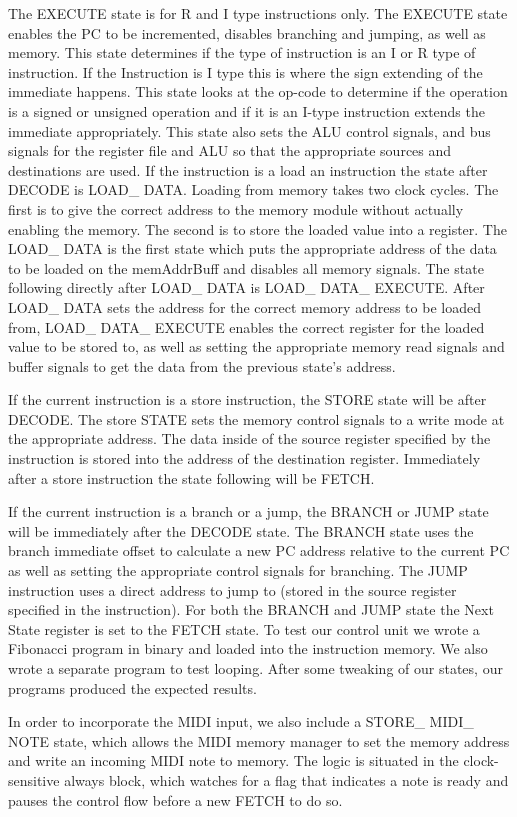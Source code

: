 \documentclass[onecolumn, 12pt]{IEEEtran}
\begin{document}
The EXECUTE state is for R and I type instructions only. The EXECUTE state enables the PC to be incremented, disables branching and jumping, as well as memory. This state determines if the type of instruction is an I or R type of instruction. If the Instruction is I type this is where the sign extending of the immediate happens. This state looks at the op-code to determine if the operation is a signed or unsigned operation and if it is an I-type instruction extends the immediate appropriately. This state also sets the ALU control signals, and bus signals for the register file and ALU so that the appropriate sources and destinations are used.
If the instruction is a load an instruction the state after DECODE is LOAD\_ DATA. Loading from memory takes two clock cycles. The first is to give the correct address to the memory module without actually enabling the memory. The second is to store the loaded value into a register. The LOAD\_ DATA is the first state which puts the appropriate address of the data to be loaded on the memAddrBuff and disables all memory signals.
The state following directly after LOAD\_ DATA is LOAD\_ DATA\_ EXECUTE. After LOAD\_ DATA sets the address for the correct memory address to be loaded from, LOAD\_ DATA\_ EXECUTE enables the correct register for the loaded value to be stored to, as well as setting the appropriate memory read signals and buffer signals to get the data from the previous state's address.
\par
If the current instruction is a store instruction, the STORE state will be after DECODE. The store STATE sets the memory control signals to a write mode at the appropriate address. The data inside of the source register specified by the instruction is stored into the address of the destination register. Immediately after a store instruction the state following will be FETCH.
\par
If the current instruction is a branch or a jump, the BRANCH or JUMP state will be immediately after the DECODE state. The BRANCH state uses the branch immediate offset to calculate a new PC address relative to the current PC as well as setting the appropriate control signals for branching. The JUMP instruction uses a direct address to jump to (stored in the source register specified in the instruction).  For both the BRANCH and JUMP state the Next State register is set to the FETCH state.
To test our control unit we wrote a Fibonacci program in binary and loaded into the instruction memory. We also wrote a separate program to test looping. After some tweaking of our states, our programs produced the expected results. 
\par
In order to incorporate the MIDI input, we also include a STORE\_ MIDI\_ NOTE state, which allows the MIDI memory manager to set the memory address and write an incoming MIDI note to memory.  The logic is situated in the clock-sensitive always block, which watches for a flag that indicates a note is ready and pauses the control flow before a new FETCH to do so.
\end{document}
